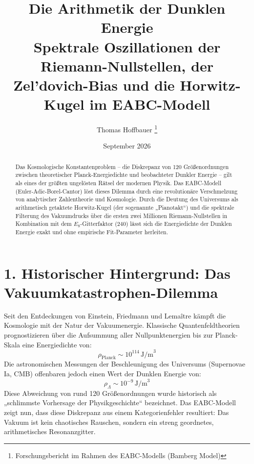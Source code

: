 \documentclass[11pt,a4paper]{article}
\title{\textbf{Die Arithmetik der Dunklen Energie}\\ \large Spektrale Oszillationen der Riemann-Nullstellen, der Zel'dovich-Bias und die Horwitz-Kugel im EABC-Modell}
\author{Thomas Hoffbauer \thanks{Forschungsbericht im Rahmen des EABC-Modells (Bamberg Model)}}
\date{September 2026}
\begin{document}
	
	\maketitle
	
	\begin{abstract}
		Das Kosmologische Konstantenproblem -- die Diskrepanz von 120 Größenordnungen zwischen theoretischer Planck-Energiedichte und beobachteter Dunkler Energie -- gilt als eines der größten ungelösten Rätsel der modernen Physik. Das EABC-Modell (Euler-Adic-Borel-Cantor) löst dieses Dilemma durch eine revolutionäre Verschmelzung von analytischer Zahlentheorie und Kosmologie. Durch die Deutung des Universums als arithmetisch getaktete Horwitz-Kugel (der sogenannte „Pianotakt“) und die spektrale Filterung des Vakuumdrucks über die ersten zwei Millionen Riemann-Nullstellen in Kombination mit dem $E_8$-Gitterfaktor ($240$) lässt sich die Energiedichte der Dunklen Energie exakt und ohne empirische Fit-Parameter herleiten.
	\end{abstract}
	
	\section{1. Historischer Hintergrund: Das Vakuumkatastrophen-Dilemma}
	Seit den Entdeckungen von Einstein, Friedmann und Lemaître kämpft die Kosmologie mit der Natur der Vakuumenergie. Klassische Quantenfeldtheorien prognostizieren über die Aufsummung aller Nullpunktenergien bis zur Planck-Skala eine Energiedichte von:
	\begin{equation}
		\rho_{\text{Planck}} \sim 10^{114} \, \text{J/m}^3
	\end{equation}
	Die astronomischen Messungen der Beschleunigung des Universums (Supernovae Ia, CMB) offenbaren jedoch einen Wert der Dunklen Energie von:
	\begin{equation}
		\rho_{\Lambda} \sim 10^{-9} \, \text{J/m}^3
	\end{equation}
	Diese Abweichung von rund 120 Größenordnungen wurde historisch als „schlimmste Vorhersage der Physikgeschichte“ bezeichnet. Das EABC-Modell zeigt nun, dass diese Diskrepanz aus einem Kategorienfehler resultiert: Das Vakuum ist kein chaotisches Rauschen, sondern ein streng geordnetes, arithmetisches Resonanzgitter.
	
\end{document}
